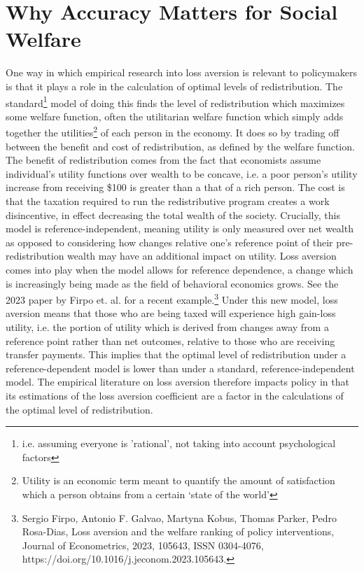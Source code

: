 \documentclass[10pt,twocolumn]{article}
\begin{document}
\section{Why Accuracy Matters for Social Welfare}
One way in which empirical research into loss aversion is relevant to policymakers is that it plays a role in the calculation of optimal levels of redistribution. The standard\footnote{i.e. assuming everyone is 'rational', not taking into account psychological factors} model of doing this finds the level of redistribution which maximizes some welfare function, often the utilitarian welfare function which simply adds together the utilities\footnote{Utility is an economic term meant to quantify the amount of satisfaction which a person obtains from a certain ‘state of the world’} of each person in the economy. It does so by trading off between the benefit and cost of redistribution, as defined by the welfare function. The benefit of redistribution comes from the fact that economists assume individual’s utility functions over wealth to be concave, i.e. a poor person’s utility increase from receiving \$100 is greater than a that of a rich person. The cost is that the taxation required to run the redistributive program creates a work disincentive, in effect decreasing the total wealth of the society. Crucially, this model is reference-independent, meaning utility is only measured over net wealth as opposed to considering how changes relative one’s reference point of their pre-redistribution wealth may have an additional impact on utility. Loss aversion comes into play when the model allows for reference dependence, a change which is increasingly being made as the field of behavioral economics grows. See the 2023 paper by Firpo et. al. for a recent example.\footnote{Sergio Firpo, Antonio F. Galvao, Martyna Kobus, Thomas Parker, Pedro Rosa-Dias, Loss aversion and the welfare ranking of policy interventions, Journal of Econometrics, 2023, 105643, ISSN 0304-4076, https://doi.org/10.1016/j.jeconom.2023.105643.} Under this new model, loss aversion means that those who are being taxed will experience high gain-loss utility, i.e. the portion of utility which is derived from changes away from a reference point rather than net outcomes, relative to those who are receiving transfer payments. This implies that the optimal level of redistribution under a reference-dependent model is lower than under a standard, reference-independent model. The empirical literature on loss aversion therefore impacts policy in that its estimations of the loss aversion coefficient are a factor in the calculations of the optimal level of redistribution. 
\end{document}
